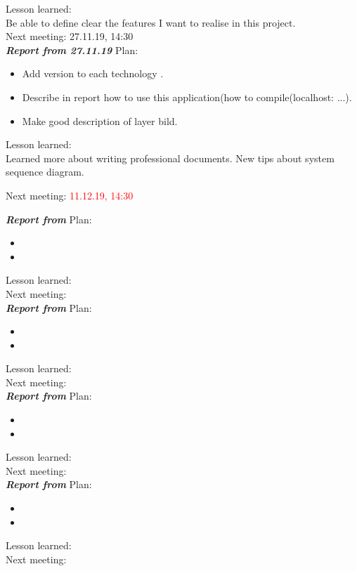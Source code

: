 \documentclass{scrartcl}
\begin{document}
Lesson learned:\\
Be able to define clear the features I want to realise in this project.\\
Next meeting: {27.11.19, 14:30} \\




\textbf{\textit{Report from 27.11.19}}
Plan:\\
\begin{itemize}
	\item	Add version to each technology .

	\item	Describe in report how to use this application(how to compile(localhost: ...).
	\item Make good description of layer bild.

\end{itemize}

Lesson learned:\\ Learned more about writing professional documents. New tips about system sequence diagram.

Next meeting: \textcolor{red}{11.12.19, 14:30}


\textbf{\textit{Report from }}
Plan:\\
\begin{itemize}
	\item	
	
	\item	

\end{itemize}

Lesson learned:\\

Next meeting: \\


\textbf{\textit{Report from }}
Plan:\\
\begin{itemize}
	\item	 

	\item	

\end{itemize}

Lesson learned:\\

Next meeting: \\



\textbf{\textit{Report from }}
Plan:\\
\begin{itemize}
	\item	

	\item	

\end{itemize}

Lesson learned:\\

Next meeting: \\



\textbf{\textit{Report from }}
Plan:\\
\begin{itemize}
	\item	 

	\item	

\end{itemize}

Lesson learned:\\

Next meeting: \\
\end{document}
